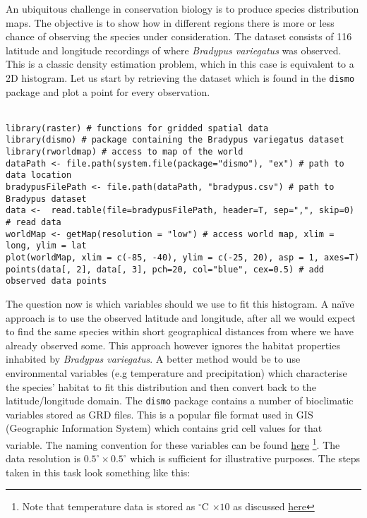 \documentclass[a4paper,11pt]{article}
\begin{document}
An ubiquitous challenge in conservation biology is to produce species distribution maps. The objective
is to show how in different regions there is more or less chance of observing the species under consideration.
The dataset consists of 116 latitude and longitude recordings of where \textit{Bradypus variegatus} was observed.
This is a classic density estimation problem, which in this case is equivalent to a 2D histogram. Let us start by 
retrieving the dataset which is found in the \texttt{dismo} package and plot a point for every observation. 
\\\\
\begin{lstlisting}[style=RCode]
library(raster) # functions for gridded spatial data
library(dismo) # package containing the Bradypus variegatus dataset
library(rworldmap) # access to map of the world
dataPath <- file.path(system.file(package="dismo"), "ex") # path to data location
bradypusFilePath <- file.path(dataPath, "bradypus.csv") # path to Bradypus dataset
data <-  read.table(file=bradypusFilePath, header=T, sep=",", skip=0) # read data
worldMap <- getMap(resolution = "low") # access world map, xlim = long, ylim = lat
plot(worldMap, xlim = c(-85, -40), ylim = c(-25, 20), asp = 1, axes=T) 
points(data[, 2], data[, 3], pch=20, col="blue", cex=0.5) # add observed data points
\end{lstlisting}

The question now is which variables should we use to fit this histogram. A na\"{i}ve approach is to use the
observed latitude and longitude, after all we would expect to find the same species within short geographical 
distances from where we have already observed some. This approach however ignores the habitat properties
inhabited by \textit{Bradypus variegatus}. A better method would be to use environmental variables (e.g temperature and precipitation) 
which characterise the species' habitat to fit this distribution and then convert back to the 
latitude/longitude domain. The \texttt{dismo} package contains a number of bioclimatic variables stored as 
GRD files. This is a popular file format used in GIS (Geographic Information System) which contains grid cell
values for that variable. The naming convention for these variables can be found \href{http://www.worldclim.org/bioclim}{here}
\footnote{Note that temperature data is stored as $^\circ$C $\times 10$ as discussed \href{http://www.worldclim.org/formats}{here}}.	   
The data resolution is $0.5^\circ \times 0.5^\circ$ which is sufficient for illustrative purposes.
The steps taken in this task look something like this:
\end{document}
